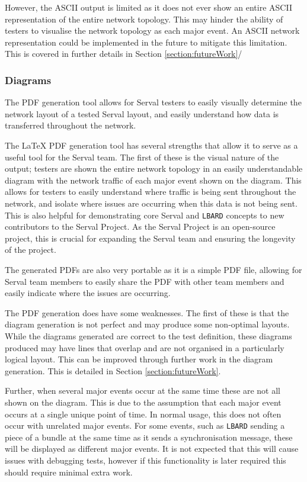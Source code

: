 However, the ASCII output is limited as it does not ever show an entire ASCII representation of the entire network topology.
This may hinder the ability of testers to visualise the network topology as each major event.
An ASCII network representation could be implemented in the future to mitigate this limitation.
This is covered in further details in Section \ref{section:futureWork}/

\subsubsection{Diagrams}
The PDF generation tool allows for Serval testers to easily visually determine the network layout of a tested Serval layout, and easily understand how data is transferred throughout the network.

The LaTeX PDF generation tool has several strengths that allow it to serve as a useful tool for the Serval team.
The first of these is the visual nature of the output; testers are shown the entire network topology in an easily understandable diagram with the network traffic of each major event shown on the diagram.
This allows for testers to easily understand where traffic is being sent throughout the network, and isolate where issues are occurring when this data is not being sent.
This is also helpful for demonstrating core Serval and \texttt{LBARD} concepts to new contributors to the Serval Project.
As the Serval Project is an open-source project, this is crucial for expanding the Serval team and ensuring the longevity of the project.

The generated PDFs are also very portable as it is a simple PDF file, allowing for Serval team members to easily share the PDF with other team members and easily indicate where the issues are occurring.

The PDF generation does have some weaknesses.
The first of these is that the diagram generation is not perfect and may produce some non-optimal layouts.
While the diagrams generated are correct to the test definition, these diagrams produced may have lines that overlap and are not organised in a particularly logical layout.
This can be improved through further work in the diagram generation.
This is detailed in Section \ref{section:futureWork}.

Further, when several major events occur at the same time these are not all shown on the diagram.
This is due to the assumption that each major event occurs at a single unique point of time.
In normal usage, this does not often occur with unrelated major events.
For some events, such as \texttt{LBARD} sending a piece of a bundle at the same time as it sends a synchronisation message, these will be displayed as different major events.
It is not expected that this will cause issues with debugging tests, however if this functionality is later required this should require minimal extra work.

